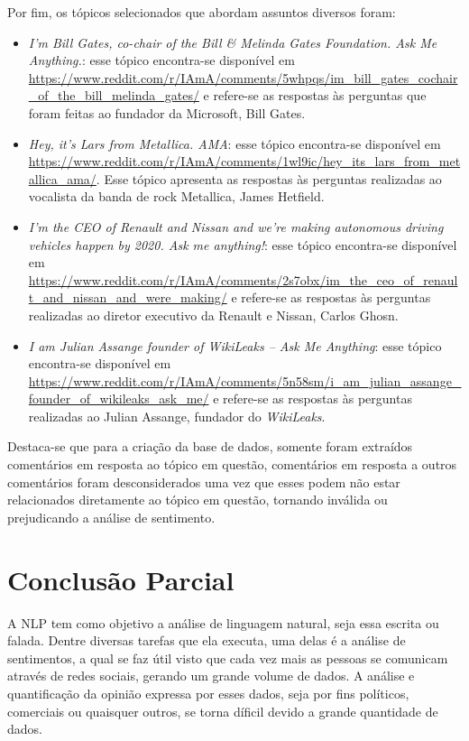 Por fim, os tópicos selecionados que abordam assuntos diversos foram:
\begin{itemize}
  \item
  \textit{I’m Bill Gates, co-chair of the Bill \& Melinda Gates Foundation. Ask
  Me Anything.}: esse tópico encontra-se disponível em
  \url{https://www.reddit.com/r/IAmA/comments/5whpqs/im_bill_gates_cochair_of_the_bill_melinda_gates/}
  e refere-se as respostas às perguntas que foram feitas ao fundador da
  Microsoft, Bill Gates.
  \item
  \textit{Hey, it's Lars from Metallica. AMA}: esse tópico encontra-se disponível em
  \url{https://www.reddit.com/r/IAmA/comments/1wl9ic/hey_its_lars_from_metallica_ama/}.
  Esse tópico apresenta as respostas às perguntas realizadas ao vocalista da
  banda de rock Metallica, James Hetfield.
  \item
  \textit{I'm the CEO of Renault and Nissan and we're making autonomous driving
  vehicles happen by 2020. Ask me anything!}: esse tópico encontra-se disponível em
  \url{https://www.reddit.com/r/IAmA/comments/2s7obx/im_the_ceo_of_renault_and_nissan_and_were_making/}
  e refere-se as respostas às perguntas realizadas ao diretor executivo da Renault e Nissan,
  Carlos Ghosn.
  
  \item
  \textit{I am Julian Assange founder of WikiLeaks -- Ask Me Anything}: esse
  tópico encontra-se disponível em
  \url{https://www.reddit.com/r/IAmA/comments/5n58sm/i_am_julian_assange_founder_of_wikileaks_ask_me/}
  e refere-se as respostas às perguntas realizadas ao Julian Assange, fundador do
  \textit{WikiLeaks}.
  
\end{itemize}


Destaca-se que para a criação da base de dados, somente foram extraídos
comentários em resposta ao tópico em questão, comentários em resposta a outros
comentários foram desconsiderados uma vez que esses podem não estar relacionados
diretamente ao tópico em questão, tornando inválida ou prejudicando a
análise de sentimento.


\chapter{Conclusão Parcial}
\label{cap:conclusao}
A \ac{NLP} tem como objetivo a análise de linguagem natural, seja
essa escrita ou falada. Dentre diversas tarefas que ela executa, uma delas é a
análise de sentimentos, a qual se faz útil visto que cada vez
mais as pessoas se comunicam através de redes sociais, gerando um grande volume
de dados. A análise e quantificação da opinião expressa por esses dados, seja
por fins políticos, comerciais ou quaisquer outros, se torna díficil devido a
grande quantidade de dados.


